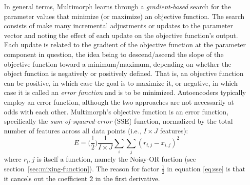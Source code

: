 In general terms, Multimorph learns through a \emph{gradient-based} 
search for the parameter values that minimize (or maximize) an objective function. The search consists of make many  incremental adjustments or updates to the parameter vector and noting the effect of each update on the objective function's output. Each update is related to the gradient 
of the objective function at the parameter component in question, the idea being to descend/ascend 
the slope of the objective function toward a minimum/maximum, depending 
on whether the object function is negatively or positively defined. 
That is, an objective function can be positive, in which case the goal is to maximize it, 
or negative, in which case it is
called an \emph{error function} and is to be minimized. Autoencoders typically 
employ an error function, although the two approaches are not necessarily at odds 
with each other. 
Multimorph's objective function is an error function, specifically the \emph{sum-of-squared-error} (SSE)  function, normalized 
by the total number of features across
all data points (i.e., $I \times J$ features):
\begin{equation} \label{eq:sse}
E = \bigg(\frac{1}{2}\bigg) \frac{1}{I \times J}\sum_{i} \sum_{j} {(r_{i,j} - x_{i,j})}^2
\end{equation}
where $r_i,j$ is itself a function, namely the Noisy-OR fuction (see section~\ref{sec:mixing-function}). The reason for factor $\frac{1}{2}$ in equation \eqref{eq:sse} is that it cancels out the coefficient 2 in the first derivative.

